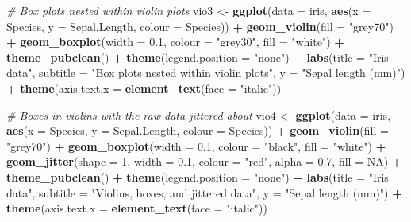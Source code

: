\documentclass[english,10pt,a4paper,oneside]{book}
\newenvironment{Shaded}{\begin{snugshade}}{\end{snugshade}}
\newcommand{\KeywordTok}[1]{\textcolor[rgb]{0.13,0.29,0.53}{\textbf{#1}}}
\newcommand{\DataTypeTok}[1]{\textcolor[rgb]{0.13,0.29,0.53}{#1}}
\newcommand{\DecValTok}[1]{\textcolor[rgb]{0.00,0.00,0.81}{#1}}
\newcommand{\FloatTok}[1]{\textcolor[rgb]{0.00,0.00,0.81}{#1}}
\newcommand{\StringTok}[1]{\textcolor[rgb]{0.31,0.60,0.02}{#1}}
\newcommand{\CommentTok}[1]{\textcolor[rgb]{0.56,0.35,0.01}{\textit{#1}}}
\newcommand{\OtherTok}[1]{\textcolor[rgb]{0.56,0.35,0.01}{#1}}
\newcommand{\OperatorTok}[1]{\textcolor[rgb]{0.81,0.36,0.00}{\textbf{#1}}}
\newcommand{\NormalTok}[1]{#1}
\theoremstyle{definition}
\theoremstyle{definition}
\theoremstyle{definition}
\theoremstyle{remark}
\begin{document}
\begin{Shaded}
\begin{Highlighting}[]
\CommentTok{# Box plots nested within violin plots}
\NormalTok{vio3 <-}\StringTok{ }\KeywordTok{ggplot}\NormalTok{(}\DataTypeTok{data =}\NormalTok{ iris, }\KeywordTok{aes}\NormalTok{(}\DataTypeTok{x =}\NormalTok{ Species, }\DataTypeTok{y =}\NormalTok{ Sepal.Length, }\DataTypeTok{colour =}\NormalTok{ Species)) }\OperatorTok{+}
\StringTok{  }\KeywordTok{geom_violin}\NormalTok{(}\DataTypeTok{fill =} \StringTok{"grey70"}\NormalTok{) }\OperatorTok{+}\StringTok{ }
\StringTok{  }\KeywordTok{geom_boxplot}\NormalTok{(}\DataTypeTok{width =} \FloatTok{0.1}\NormalTok{, }\DataTypeTok{colour =} \StringTok{"grey30"}\NormalTok{, }\DataTypeTok{fill =} \StringTok{"white"}\NormalTok{) }\OperatorTok{+}
\StringTok{  }\KeywordTok{theme_pubclean}\NormalTok{() }\OperatorTok{+}\StringTok{ }\KeywordTok{theme}\NormalTok{(}\DataTypeTok{legend.position =} \StringTok{"none"}\NormalTok{) }\OperatorTok{+}
\StringTok{  }\KeywordTok{labs}\NormalTok{(}\DataTypeTok{title =} \StringTok{"Iris data"}\NormalTok{,}
       \DataTypeTok{subtitle =} \StringTok{"Box plots nested within violin plots"}\NormalTok{, }\DataTypeTok{y =} \StringTok{"Sepal length (mm)"}\NormalTok{) }\OperatorTok{+}
\StringTok{  }\KeywordTok{theme}\NormalTok{(}\DataTypeTok{axis.text.x =} \KeywordTok{element_text}\NormalTok{(}\DataTypeTok{face =} \StringTok{"italic"}\NormalTok{))}

\CommentTok{# Boxes in violins with the raw data jittered about}
\NormalTok{vio4 <-}\StringTok{ }\KeywordTok{ggplot}\NormalTok{(}\DataTypeTok{data =}\NormalTok{ iris, }\KeywordTok{aes}\NormalTok{(}\DataTypeTok{x =}\NormalTok{ Species, }\DataTypeTok{y =}\NormalTok{ Sepal.Length, }\DataTypeTok{colour =}\NormalTok{ Species)) }\OperatorTok{+}
\StringTok{  }\KeywordTok{geom_violin}\NormalTok{(}\DataTypeTok{fill =} \StringTok{"grey70"}\NormalTok{) }\OperatorTok{+}\StringTok{ }
\StringTok{  }\KeywordTok{geom_boxplot}\NormalTok{(}\DataTypeTok{width =} \FloatTok{0.1}\NormalTok{, }\DataTypeTok{colour =} \StringTok{"black"}\NormalTok{, }\DataTypeTok{fill =} \StringTok{"white"}\NormalTok{) }\OperatorTok{+}
\StringTok{  }\KeywordTok{geom_jitter}\NormalTok{(}\DataTypeTok{shape =} \DecValTok{1}\NormalTok{, }\DataTypeTok{width =} \FloatTok{0.1}\NormalTok{, }\DataTypeTok{colour =} \StringTok{"red"}\NormalTok{, }\DataTypeTok{alpha =} \FloatTok{0.7}\NormalTok{, }\DataTypeTok{fill =} \OtherTok{NA}\NormalTok{) }\OperatorTok{+}
\StringTok{  }\KeywordTok{theme_pubclean}\NormalTok{() }\OperatorTok{+}\StringTok{ }\KeywordTok{theme}\NormalTok{(}\DataTypeTok{legend.position =} \StringTok{"none"}\NormalTok{) }\OperatorTok{+}
\StringTok{  }\KeywordTok{labs}\NormalTok{(}\DataTypeTok{title =} \StringTok{"Iris data"}\NormalTok{,}
       \DataTypeTok{subtitle =} \StringTok{"Violins, boxes, and jittered data"}\NormalTok{, }\DataTypeTok{y =} \StringTok{"Sepal length (mm)"}\NormalTok{) }\OperatorTok{+}
\StringTok{  }\KeywordTok{theme}\NormalTok{(}\DataTypeTok{axis.text.x =} \KeywordTok{element_text}\NormalTok{(}\DataTypeTok{face =} \StringTok{"italic"}\NormalTok{))}


\end{Highlighting}
\end{Shaded}
\end{document}
